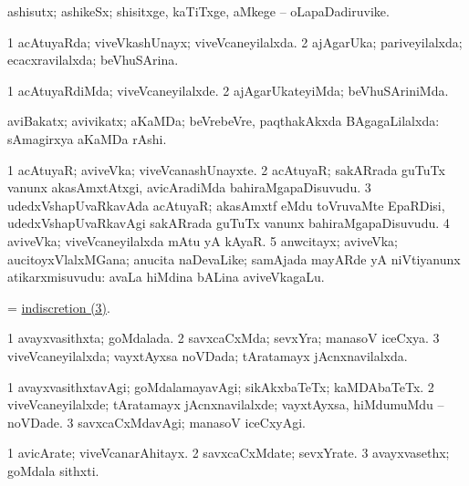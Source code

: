 \bentry
{}
\gl{\gu}
\bmng
ashisutx; ashikeSx; shisitxge, kaTiTxge, aMkege -- oLapaDadiruvike. 
\emng
\eentry

\bentry
{}
\gl{\gu}
\bmng
\bnum
\num{1} acAtuyaRda; viveVkashUnayx; viveVcaneyilalxda. 
\num{2} ajAgarUka; pariveyilalxda; ecacxravilalxda; beVhuSArina. 
\enum
\emng
\eentry

\bentry
{}
\gl{\kirxvi}
\bmng
\bnum
\num{1} acAtuyaRdiMda; viveVcaneyilalxde. 
\num{2} ajAgarUkateyiMda; beVhuSAriniMda. 
\enum
\emng
\eentry

\bentry
{}
\gl{\gu}
\bmng
aviBakatx; avivikatx; aKaMDa; beVrebeVre, paqthakAkxda BAgagaLilalxda:  sAmagirxya aKaMDa rAshi. 
\emng
\eentry

\bentry
{}
\gl{\nA}
\bmng
\bnum
\num{1} acAtuyaR; aviveVka; viveVcanashUnayxte. 
\num{2} acAtuyaR; sakARrada guTuTx \mo vanunx akasAmxtAtxgi, avicAradiMda bahiraMgapaDisuvudu. 
\hypertarget{indiscretion(3)}{} 
\num{3} udedxVshapUvaRkavAda acAtuyaR; akasAmxtf eMdu toVruvaMte EpaRDisi, udedxVshapUvaRkavAgi sakARrada guTuTx \mo vanunx bahiraMgapaDisuvudu. 
\num{4} aviveVka; viveVcaneyilalxda mAtu yA kAyaR. 
\num{5} anwcitayx; aviveVka; aucitoyxVlalxMGana; anucita naDevaLike; samAjada mayARde yA niVtiyanunx atikarxmisuvudu:  avaLa hiMdina bALina aviveVkagaLu. 
\enum
\emng

\noindent
\gl{\pagu}
\bmng
{} = \hyperlink{indiscretion(3)}{indiscretion (3)}. 
\emng
\eentry

\bentry
{}
\gl{\gu}
\bmng
\bnum
\num{1} avayxvasithxta; goMdalada. 
\num{2} savxcaCxMda; sevxYra; manasoV iceCxya. 
\num{3} viveVcaneyilalxda; vayxtAyxsa noVDada; tAratamayx jAcnxnavilalxda. 
\enum
\emng
\eentry

\bentry
{}
\gl{\kirxvi}
\bmng
\bnum
\num{1} avayxvasithxtavAgi; goMdalamayavAgi; sikAkxbaTeTx; kaMDAbaTeTx. 
\num{2} viveVcaneyilalxde; tAratamayx jAcnxnavilalxde; vayxtAyxsa, hiMdumuMdu -- noVDade. 
\num{3} savxcaCxMdavAgi; manasoV iceCxyAgi. 
\enum
\emng
\eentry

\bentry
{}
\gl{\nA}
\bmng
\bnum
\num{1} avicArate; viveVcanarAhitayx. 
\num{2} savxcaCxMdate; sevxYrate. 
\num{3} avayxvasethx; goMdala sithxti. 
\enum
\emng
\eentry

